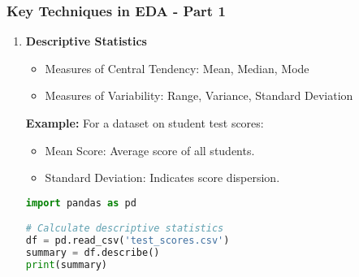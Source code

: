 \documentclass{beamer}
\begin{document}
\begin{frame}[fragile]
    \frametitle{Key Techniques in EDA - Part 1}
    \begin{enumerate}
        \item \textbf{Descriptive Statistics}
        \begin{itemize}
            \item Measures of Central Tendency: Mean, Median, Mode
            \item Measures of Variability: Range, Variance, Standard Deviation
        \end{itemize}
        \textbf{Example:} For a dataset on student test scores:
        \begin{itemize}
            \item Mean Score: Average score of all students.
            \item Standard Deviation: Indicates score dispersion.
        \end{itemize}
        \begin{lstlisting}[language=Python]
import pandas as pd

# Calculate descriptive statistics
df = pd.read_csv('test_scores.csv')
summary = df.describe()
print(summary)
        \end{lstlisting}
    \end{enumerate}
\end{frame}
\end{document}
